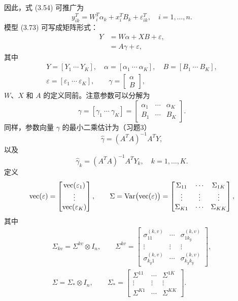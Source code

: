 因此，式 (3.54) 可推广为
\begin{equation}
y_{ik}^T=W_i^T\alpha_k+x_i^TB_k+\varepsilon_{ik}^T,\quad i=1,\ldots,n.
\tag{3.73}
\end{equation}
模型 (3.73) 可写成矩阵形式：
\begin{equation}
\begin{aligned}
Y&=W\alpha+XB+\varepsilon,\\
&=A\gamma+\varepsilon,
\end{aligned}
\tag{3.74}
\end{equation}
其中
\[
\begin{gathered}
Y=[Y_1\ \cdots\ Y_K],\quad \alpha=[\alpha_1\ \cdots\ \alpha_K],\quad
B=[B_1\ \cdots\ B_K],\\
\varepsilon=[\varepsilon_1\ \cdots\ \varepsilon_K],\qquad
\gamma=\begin{bmatrix}\alpha\\B\end{bmatrix},
\end{gathered}
\]
$W$、$X$ 和 $A$ 的定义同前。注意参数可以分解为
\[
\gamma=[\gamma_1\ \cdots\ \gamma_K]
=\begin{bmatrix}\alpha_1&\cdots&\alpha_K\\B_1&\cdots&B_K\end{bmatrix}.
\]
同样，参数向量 $\gamma$ 的最小二乘估计为（习题3）
\begin{equation}
\hat\gamma=(A^TA)^{-1}A^TY,
\tag{3.75}
\end{equation}
以及
\begin{equation}
\hat\gamma_k=(A^TA)^{-1}A^TY_k,\quad k=1,\ldots,K.
\tag{3.76}
\end{equation}
定义
\[
\operatorname{vec}(\varepsilon)=\begin{bmatrix}\operatorname{vec}(\varepsilon_1)\\\vdots\\\operatorname{vec}(\varepsilon_K)\end{bmatrix},
\qquad
\Sigma=\operatorname{Var}\bigl(\operatorname{vec}(\varepsilon)\bigr)
=\begin{bmatrix}\Sigma_{11}&\cdots&\Sigma_{1K}\\\vdots&\vdots&\vdots\\\Sigma_{K1}&\cdots&\Sigma_{KK}\end{bmatrix},
\]
其中
\[
\begin{gathered}
\Sigma_{kv}=\Sigma^{kv}\otimes I_n,\qquad
\Sigma^{kv}=\begin{bmatrix}
\sigma_{11}^{(k,v)}&\cdots&\sigma_{1k_y}^{(k,v)}\\
\vdots&\vdots&\vdots\\
\sigma_{k_y1}^{(k,v)}&\cdots&\sigma_{k_yk_y}^{(k,v)}
\end{bmatrix},\\
\Sigma=\Sigma_*\otimes I_n,\qquad
\Sigma_*=\begin{bmatrix}
\Sigma^{11}&\cdots&\Sigma^{1K}\\
\vdots&\vdots&\vdots\\
\Sigma^{K1}&\cdots&\Sigma^{KK}
\end{bmatrix}.
\end{gathered}
\]
